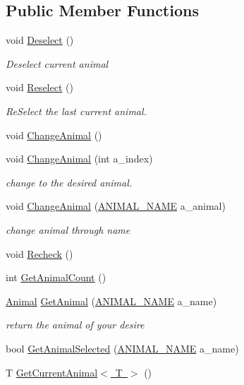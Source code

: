 \subsection*{Public Member Functions}
\begin{DoxyCompactItemize}
\item 
void \mbox{\hyperlink{class_animal_controller_a674f8d1c35dbc9a52357d80d192fc0c1}{Deselect}} ()
\begin{DoxyCompactList}\small\item\em Deselect current animal \end{DoxyCompactList}\item 
void \mbox{\hyperlink{class_animal_controller_a6951090bd26d6a25d3e9b62cc973a260}{Reselect}} ()
\begin{DoxyCompactList}\small\item\em Re\+Select the last current animal. \end{DoxyCompactList}\item 
void \mbox{\hyperlink{class_animal_controller_afcab1e5b036dc710a090cd7dac94090e}{Change\+Animal}} ()
\item 
void \mbox{\hyperlink{class_animal_controller_af0ae4eaa20fdc725a225b8062d5f6007}{Change\+Animal}} (int a\+\_\+index)
\begin{DoxyCompactList}\small\item\em change to the desired animal. \end{DoxyCompactList}\item 
void \mbox{\hyperlink{class_animal_controller_aac3d9d5df568e50019de0c8dd39245a3}{Change\+Animal}} (\mbox{\hyperlink{_animal_8cs_a2fa5713399b84d1b88dae9196837af50}{A\+N\+I\+M\+A\+L\+\_\+\+N\+A\+ME}} a\+\_\+animal)
\begin{DoxyCompactList}\small\item\em change animal through name \end{DoxyCompactList}\item 
void \mbox{\hyperlink{class_animal_controller_a89f9677493d111f6edcd34a56e31fb3c}{Recheck}} ()
\item 
int \mbox{\hyperlink{class_animal_controller_aba92998e5cc59381b205a42f53f4d875}{Get\+Animal\+Count}} ()
\item 
\mbox{\hyperlink{class_animal}{Animal}} \mbox{\hyperlink{class_animal_controller_acc148bcd2c8d45210d266f2a6ae1dcfb}{Get\+Animal}} (\mbox{\hyperlink{_animal_8cs_a2fa5713399b84d1b88dae9196837af50}{A\+N\+I\+M\+A\+L\+\_\+\+N\+A\+ME}} a\+\_\+name)
\begin{DoxyCompactList}\small\item\em return the animal of your desire \end{DoxyCompactList}\item 
bool \mbox{\hyperlink{class_animal_controller_a778b5b9ede6ee38c4368d0707f9f2b7d}{Get\+Animal\+Selected}} (\mbox{\hyperlink{_animal_8cs_a2fa5713399b84d1b88dae9196837af50}{A\+N\+I\+M\+A\+L\+\_\+\+N\+A\+ME}} a\+\_\+name)
\item 
T \mbox{\hyperlink{class_animal_controller_a1463a70fbd663135c7fdd291e81f5950}{Get\+Current\+Animal$<$ T $>$}} ()
\end{DoxyCompactItemize}
